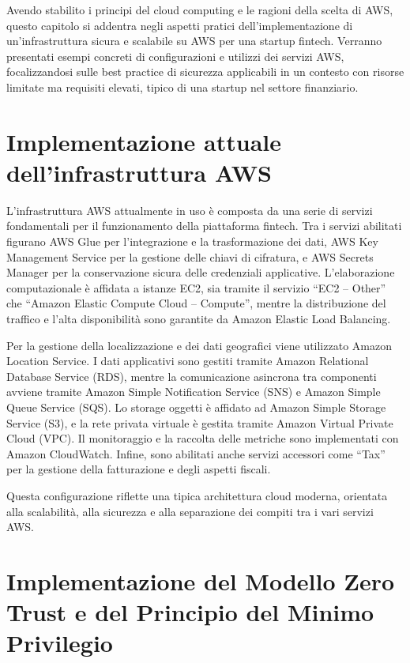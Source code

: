 Avendo stabilito i principi del cloud computing e le ragioni della scelta di AWS, questo capitolo si addentra negli aspetti pratici dell'implementazione di un'infrastruttura sicura e scalabile su AWS per una startup fintech. Verranno presentati esempi concreti di configurazioni e utilizzi dei servizi AWS, focalizzandosi sulle best practice di sicurezza applicabili in un contesto con risorse limitate ma requisiti elevati, tipico di una startup nel settore finanziario.

\section{Implementazione attuale dell'infrastruttura AWS} 
L'infrastruttura AWS attualmente in uso è composta da una serie di servizi fondamentali per il funzionamento della piattaforma fintech. Tra i servizi abilitati figurano AWS Glue per l'integrazione e la trasformazione dei dati, AWS Key Management Service per la gestione delle chiavi di cifratura, e AWS Secrets Manager per la conservazione sicura delle credenziali applicative. L'elaborazione computazionale è affidata a istanze EC2, sia tramite il servizio “EC2 – Other” che “Amazon Elastic Compute Cloud – Compute”, mentre la distribuzione del traffico e l'alta disponibilità sono garantite da Amazon Elastic Load Balancing.

Per la gestione della localizzazione e dei dati geografici viene utilizzato Amazon Location Service. I dati applicativi sono gestiti tramite Amazon Relational Database Service (RDS), mentre la comunicazione asincrona tra componenti avviene tramite Amazon Simple Notification Service (SNS) e Amazon Simple Queue Service (SQS). Lo storage oggetti è affidato ad Amazon Simple Storage Service (S3), e la rete privata virtuale è gestita tramite Amazon Virtual Private Cloud (VPC). Il monitoraggio e la raccolta delle metriche sono implementati con Amazon CloudWatch. Infine, sono abilitati anche servizi accessori come “Tax” per la gestione della fatturazione e degli aspetti fiscali.

Questa configurazione riflette una tipica architettura cloud moderna, orientata alla scalabilità, alla sicurezza e alla separazione dei compiti tra i vari servizi AWS.




\section{Implementazione del Modello Zero Trust e del Principio del Minimo Privilegio}
\label{sec:zero-trust-implementation}

